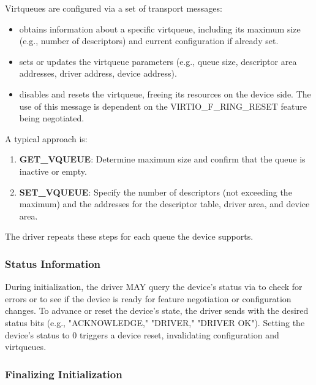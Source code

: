 Virtqueues are configured via a set of transport messages:

\begin{itemize}
  \item {} obtains information about a specific virtqueue,
    including its maximum size (e.g., number of descriptors) and current
    configuration if already set.
  \item {} sets or updates the virtqueue parameters (e.g.,
    queue size, descriptor area addresses, driver address, device address).
  \item {} disables and resets the virtqueue, freeing its
    resources on the device side.  The use of this message is dependent on the
    VIRTIO_F_RING_RESET feature being negotiated.
\end{itemize}

A typical approach is:
\begin{enumerate}
  \item \textbf{GET\_VQUEUE}: Determine maximum size and confirm that the queue
        is inactive or empty.
  \item \textbf{SET\_VQUEUE}: Specify the number of descriptors (not exceeding
        the maximum) and the addresses for the descriptor table, driver area,
        and device area.  
\end{enumerate}

The driver repeats these steps for each queue the device supports.

\subsubsection{Status Information}
\label{sec:Virtio Transport Options / Virtio Over Messages / Device Initialization / Status Information}

During initialization, the driver MAY query the device's status via
 to check for errors or to see if the device is ready
for feature negotiation or configuration changes. To advance or reset the
device's state, the driver sends  with the desired
status bits (e.g., "ACKNOWLEDGE," "DRIVER," "DRIVER OK"). Setting the device's
status to 0 triggers a device reset, invalidating configuration and
virtqueues.

\subsubsection{Finalizing Initialization}

